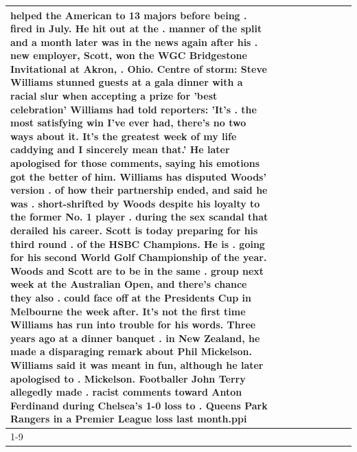 \begin{table}[H]
\begin{tabular}{lllrlllll}
helped the American to 13 majors before being . fired in July. He hit out at the . manner of the split and a month later was in the news again after his . new employer, Scott, won the WGC Bridgestone Invitational at Akron, . Ohio. Centre of storm: Steve Williams stunned guests at a gala dinner with a racial slur when accepting a prize for 'best celebration' Williams had told reporters: 'It's . the most satisfying win I've ever had, there's no two ways about it. It's the greatest week of my life caddying and I sincerely mean that.' He later apologised for those comments, saying his emotions got the better of him. Williams has disputed Woods' version . of how their partnership ended, and said he was . short-shrifted by Woods despite his loyalty to the former No. 1 player . during the sex scandal that derailed his career. Scott is today preparing for his third round . of the HSBC Champions. He is . going for his second World Golf Championship of the year. Woods and Scott are to be in the same . group next week at the Australian Open, and there's chance they also . could face off at the Presidents Cup in Melbourne the week after. It's not the first time Williams has run into trouble for his words. Three years ago at a dinner banquet . in New Zealand, he made a disparaging remark about Phil Mickelson. Williams said it was meant in fun, although he later apologised to . Mickelson. Footballer John Terry allegedly made . racist comments toward Anton Ferdinand during Chelsea's 1-0 loss to . Queens Park Rangers in a Premier League loss last month.ppi \\
\cline{1-9}

\end{tabular}
\end{table}

